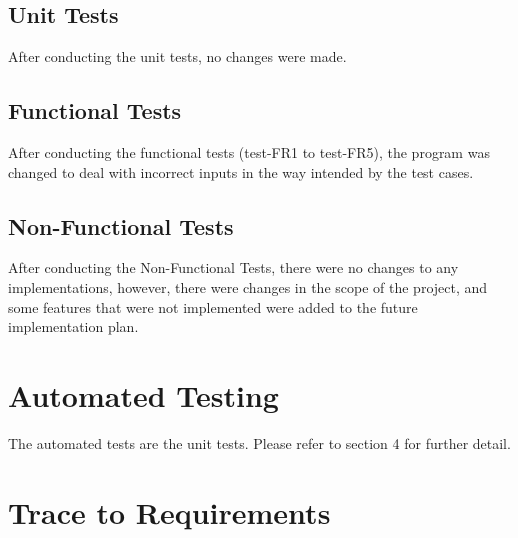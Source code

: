\documentclass[12pt, titlepage]{article}
\begin{document}
\subsection{Unit Tests}
After conducting the unit tests, no changes were made.

\subsection{Functional Tests}
After conducting the functional tests (test-FR1 to test-FR5), the program was changed to deal with incorrect inputs in the way intended by the test cases.

\subsection{Non-Functional Tests}
After conducting the Non-Functional Tests, there were no changes to any implementations, however, there were changes in the scope of the project, and some features that were not implemented were added to the future implementation plan.
    

\section{Automated Testing}
The automated tests are the unit tests. Please refer to section 4 for further detail. 

\section{Trace to Requirements}
\end{document}
